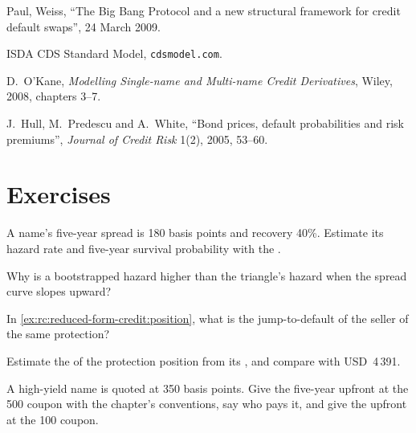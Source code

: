 \begin{omsources}
\item Paul, Weiss, ``The Big Bang Protocol and a new structural framework for credit
default swaps'', 24 March 2009.
\item ISDA CDS Standard Model, \texttt{cdsmodel.com}.
\item D.\ O'Kane, \emph{Modelling Single-name and Multi-name Credit Derivatives}, Wiley,
2008, chapters 3--7.
\item J.\ Hull, M.\ Predescu and A.\ White, ``Bond prices, default probabilities and risk premiums'',
\emph{Journal of Credit Risk} 1(2), 2005, 53--60.
\end{omsources}

\section{Exercises}

\begin{exercise}[$\star$]\label{exo:rc:reduced-form-credit:1}
A name's five-year spread is 180 basis points and recovery 40\%. Estimate its hazard rate
and five-year survival probability with the .
\end{exercise}

\begin{exercise}[$\star$]\label{exo:rc:reduced-form-credit:2}
Why is a bootstrapped hazard higher than the triangle's hazard when the spread curve
slopes upward?
\end{exercise}

\begin{exercise}[$\star$]\label{exo:rc:reduced-form-credit:3}
In \cref{ex:rc:reduced-form-credit:position}, what is the jump-to-default of the seller of
the same protection?
\end{exercise}

\begin{exercise}[$\star\star$]\label{exo:rc:reduced-form-credit:4}
Estimate the  of the protection position from its , and compare with
USD~4\,391.
\end{exercise}

\begin{exercise}[$\star\star$]\label{exo:rc:reduced-form-credit:5}
A high-yield name is quoted at 350 basis points. Give the five-year upfront at the 500
coupon with the chapter's conventions, say who pays it, and give the upfront at the 100
coupon.
\end{exercise}

